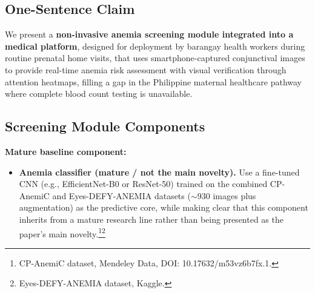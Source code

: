 \documentclass[11pt]{article}
\begin{document}
    \subsection{One-Sentence Claim}

    We present a \textbf{non-invasive anemia screening module integrated into a medical platform}, designed for deployment by barangay health workers during routine prenatal home visits, that uses smartphone-captured conjunctival images to provide real-time anemia risk assessment with visual verification through attention heatmaps, filling a gap in the Philippine maternal healthcare pathway where complete blood count testing is unavailable.

    \subsection{Screening Module Components}

    \textbf{Mature baseline component:}
    \begin{itemize}[leftmargin=1.5em]
        \item \textbf{Anemia classifier (mature / not the main novelty).} Use a fine-tuned CNN (e.g., EfficientNet-B0 or ResNet-50) trained on the combined CP-AnemiC and Eyes-DEFY-ANEMIA datasets ($\sim$930 images plus augmentation) as the predictive core, while making clear that this component inherits from a mature research line rather than being presented as the paper's main novelty.\footnote{CP-AnemiC dataset, Mendeley Data, DOI: 10.17632/m53vz6b7fx.1.}\footnote{Eyes-DEFY-ANEMIA dataset, Kaggle.}
    \end{itemize}
\end{document}
